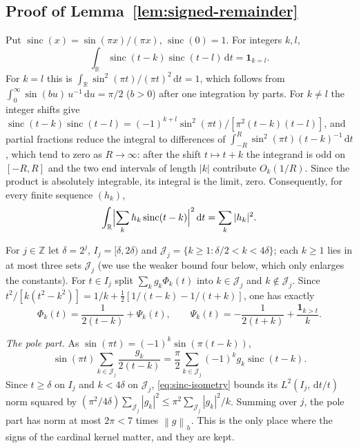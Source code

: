 \documentclass{siamart251216}
\newcommand{\R}{\mathbb R}
\newcommand{\norm}[1]{\left\lVert#1\right\rVert}
\newcommand{\dd}{\,\mathrm d}
\begin{document}
\subsection{\texorpdfstring{Proof of Lemma~\ref{lem:signed-remainder}}{Proof of the signed remainder lemma}}

Put $\operatorname{sinc}(x)=\sin(\pi x)/(\pi x)$, $\operatorname{sinc}(0)=1$.
For integers $k,l$,
\begin{equation}\label{eq:sinc-orth}
 \int_{\R}\operatorname{sinc}(t-k)\operatorname{sinc}(t-l)\dd t=\boldsymbol1_{k=l}.
\end{equation}
For $k=l$ this is $\int_{\R}\sin^2(\pi t)/(\pi t)^2\dd t=1$, which follows
from $\int_0^\infty\sin(bu)\,u^{-1}\dd u=\pi/2$ ($b>0$) after one integration
by parts. For $k\ne l$ the integer shifts give
$\operatorname{sinc}(t-k)\operatorname{sinc}(t-l)=(-1)^{k+l}\sin^2(\pi t)/[\pi^2(t-k)(t-l)]$,
and partial fractions reduce the integral to differences of
$\int_{-R}^R\sin^2(\pi t)(t-k)^{-1}\dd t$, which tend to zero as
$R\to\infty$: after the shift $t\mapsto t+k$ the integrand is odd on
$[-R,R]$ and the two end intervals of length $|k|$ contribute $O_k(1/R)$.
Since the product is absolutely integrable, its integral is the limit,
zero. Consequently, for every finite sequence $(h_k)$,
\begin{equation}\label{eq:sinc-isometry}
 \int_{\R}\Bigl|\sum_kh_k\operatorname{sinc}(t-k)\Bigr|^2\dd t=\sum_k|h_k|^2 .
\end{equation}

For $j\in\mathbb Z$ let $\delta=2^j$, $I_j=[\delta,2\delta)$ and
$\mathcal J_j=\{k\ge1:\delta/2<k<4\delta\}$; each $k\ge1$ lies in at most
three sets $\mathcal J_j$ (we use the weaker bound four below, which only
enlarges the constants). For $t\in I_j$ split $\sum_kg_k\Phi_k(t)$ into
$k\in\mathcal J_j$ and $k\notin\mathcal J_j$. Since
$t^2/[k(t^2-k^2)]=1/k+\tfrac12[1/(t-k)-1/(t+k)]$, one has exactly
\begin{equation}\label{eq:Phi-split}
 \Phi_k(t)=\frac1{2(t-k)}+\Psi_k(t),\qquad
 \Psi_k(t)=-\frac1{2(t+k)}+\frac{\boldsymbol1_{k>t}}k .
\end{equation}

\emph{The pole part.} As $\sin(\pi t)=(-1)^k\sin(\pi(t-k))$,
\[
 \sin(\pi t)\sum_{k\in\mathcal J_j}\frac{g_k}{2(t-k)}
 =\frac\pi2\sum_{k\in\mathcal J_j}(-1)^kg_k\operatorname{sinc}(t-k).
\]
Since $t\ge\delta$ on $I_j$ and $k<4\delta$ on $\mathcal J_j$,
\eqref{eq:sinc-isometry} bounds its $L^2(I_j,\dd t/t)$ norm squared by
$(\pi^2/4\delta)\sum_{\mathcal J_j}|g_k|^2\le\pi^2\sum_{\mathcal J_j}|g_k|^2/k$.
Summing over $j$, the pole part has norm at most $2\pi<7$ times
$\norm g_h$. This is the only place where the signs of the cardinal
kernel matter, and they are kept.
\end{document}
